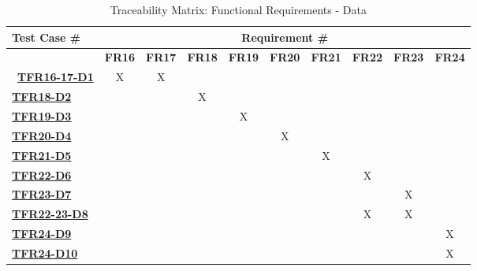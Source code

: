 \documentclass[12pt, titlepage]{article}
\begin{document}
\begin{table}[H]
    \centering
    \begin{adjustbox}{width=1\textwidth}
    \begin{tabular}{l|ccccccccc}
        \textbf{Test Case \#} & \multicolumn{9}{c}{\textbf{Requirement \#}}\\
        \hline
        ~ & \textbf{FR16} & \textbf{FR17} & \textbf{FR18} & \textbf{FR19} & \textbf{FR20} & \textbf{FR21} & \textbf{FR22} & \textbf{FR23} & \textbf{FR24} \\\
        \hyperref[TFR16-17-D1]{\textbf{TFR16-17-D1}}   & X & X & ~ & ~ & ~ & ~ & ~ & ~ & ~ \\
        \hyperref[TFR18-D2]{\textbf{TFR18-D2}}   & ~ & ~ & X & ~ & ~ & ~ & ~ & ~ & ~ \\
        \hyperref[TFR19-D3]{\textbf{TFR19-D3}}   & ~ & ~ & ~ & X & ~ & ~ & ~ & ~ & ~ \\
        \hyperref[TFR20-D4]{\textbf{TFR20-D4}}   & ~ & ~ & ~ & ~ & X & ~ & ~ & ~ & ~ \\
        \hyperref[TFR21-D5]{\textbf{TFR21-D5}}  & ~ & ~ & ~ & ~ & ~ & X & ~ & ~ & ~ \\
        \hyperref[TFR22-D6]{\textbf{TFR22-D6}}  & ~ & ~ & ~ & ~ & ~ & ~ & X & ~ & ~ \\
        \hyperref[TFR23-D7]{\textbf{TFR23-D7}}   & ~ & ~ & ~ & ~ & ~ & ~ & ~ & X & ~ \\
        \hyperref[TFR22-23-D8]{\textbf{TFR22-23-D8}}   & ~ & ~ & ~ & ~ & ~ & ~ & X & X & ~ \\
        \hyperref[TFR24-D9]{\textbf{TFR24-D9}}   & ~ & ~ & ~ & ~ & ~ & ~ & ~ & ~ & X \\
        \hyperref[TFR24-D10]{\textbf{TFR24-D10}}   & ~ & ~ & ~ & ~ & ~ & ~ & ~ & ~ & X \\
    \end{tabular}
    \end{adjustbox}
    \caption{Traceability Matrix: Functional Requirements - Data}
    \label{Traceability Matrix: Functional Requirements - Data}
\end{table}
\end{document}
